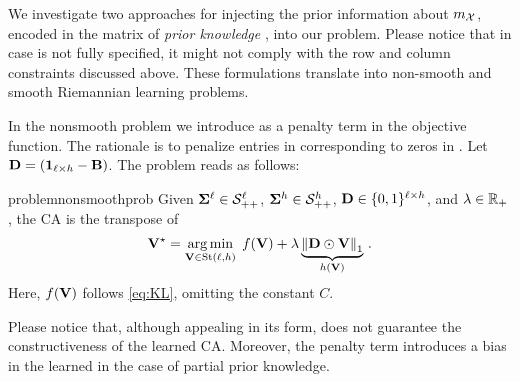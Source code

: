 We investigate two approaches for injecting the prior information about $m_\mathcal{X}$, encoded in the matrix of \emph{prior knowledge} \B, into our problem.
Please notice that in case \B is not fully specified, it might not comply with the row and column constraints discussed above.
These formulations translate into non-smooth and smooth Riemannian learning problems.

In the nonsmooth problem we introduce \B as a penalty term in the objective function. The rationale is to penalize entries in \V corresponding to zeros in \B. Let $\mathbf{D}=(\boldsymbol{1}_{\ell \times h} - \mathbf{B})$.
The problem reads as follows:
\begin{restatable}{problem}{nonsmoothprob}\label{prob:nonsmooth}
    Given $\boldsymbol{\Sigma}^{\ell} \in \mathcal{S}_{++}^{\ell}$, $\boldsymbol{\Sigma}^{h} \in \mathcal{S}_{++}^{h}$, $\mathbf{D} \in \{0,1\}^{\ell \times h}$, and $\lambda \in \mathbb{R}_+$, the CA is the transpose of
    \begin{equation}\label{eq:minKL}
        \mathbf{V}^\star = \operatorname*{arg\,min}_{\mathbf{V} \in \mathrm{St}({\ell},{h})} \; f(\mathbf{V})  + \lambda \underbrace{\norm{\mathbf{D} \odot \mathbf{V}}_1}_{h(\mathbf{V})}\,.
    \end{equation}
    Here, $f(\mathbf{V})$ follows \cref{eq:KL}, omitting the constant $C$.
\end{restatable}
Please notice that, although appealing in its form,  does not guarantee the constructiveness of the learned CA.
Moreover, the penalty term introduces a bias in the learned \V in the case of partial prior knowledge.

